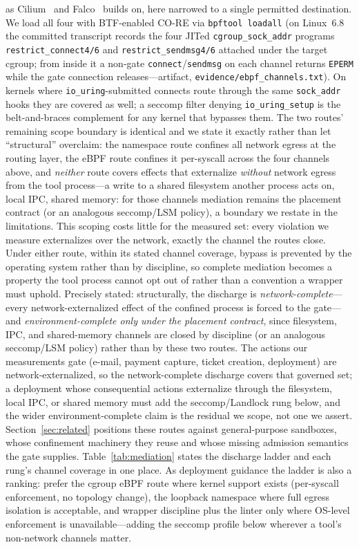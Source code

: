 \documentclass[10pt,journal,compsoc]{IEEEtran}
\begin{document}
as Cilium~\cite{cilium} and Falco~\cite{falco} builds on, here narrowed to a
single permitted destination. We load all four with BTF-enabled CO-RE via
\texttt{bpftool loadall} (on Linux~6.8 the committed transcript records the
four JITed \texttt{cgroup\_sock\_addr} programs
\texttt{restrict\_connect4/6} and \texttt{restrict\_sendmsg4/6} attached under
the target cgroup; from inside it a non-gate \texttt{connect}/\texttt{sendmsg}
on each channel returns \texttt{EPERM} while the gate connection
releases---artifact, \texttt{evidence/ebpf\_channels.txt}). On kernels where
\texttt{io\_uring}-submitted connects route through the same \texttt{sock\_addr}
hooks they are covered as well; a seccomp filter denying
\texttt{io\_uring\_setup} is the belt-and-braces complement for any kernel that
bypasses them. The two routes' remaining scope boundary is identical and we
state it exactly rather than let ``structural'' overclaim: the namespace route
confines all network egress at the routing layer, the eBPF route confines it
per-syscall across the four channels above, and \emph{neither} route covers
effects that externalize \emph{without} network egress from the tool
process---a write to a shared filesystem another process acts on, local IPC,
shared memory: for those channels mediation remains the placement contract (or
an analogous seccomp/LSM policy), a boundary we restate in the limitations.
This scoping costs little for the measured set: every violation we measure externalizes over the network, exactly the channel the routes close. Under either route, within its
stated channel coverage, bypass is
prevented by the operating system rather than by discipline, so
complete mediation becomes a property the tool process cannot opt out of
rather than a convention a wrapper must uphold. Precisely stated: structurally, the discharge is
\emph{network-complete}---every network-externalized effect of the confined
process is forced to the gate---and \emph{environment-complete only under the
placement contract}, since filesystem, IPC, and shared-memory channels are
closed by discipline (or an analogous seccomp/LSM policy) rather than by these
two routes. The actions our measurements gate (e-mail, payment capture, ticket creation, deployment) are network-externalized, so the network-complete discharge covers that governed set; a deployment whose consequential actions externalize through the filesystem, local IPC, or shared memory must add the seccomp/Landlock rung below, and the wider environment-complete claim is the residual we scope, not one we assert.
Section~\ref{sec:related} positions these routes against general-purpose
sandboxes, whose confinement machinery they reuse and whose missing
admission semantics the gate supplies. Table~\ref{tab:mediation} states the discharge ladder and each rung's
channel coverage in one place. As deployment guidance the ladder is also a ranking: prefer the
cgroup eBPF route where kernel support exists (per-syscall enforcement, no
topology change), the loopback namespace where full egress isolation is
acceptable, and wrapper discipline plus the linter only where OS-level
enforcement is unavailable---adding the seccomp profile below wherever a
tool's non-network channels matter.
\end{document}
